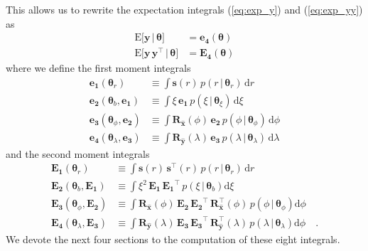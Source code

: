 \documentclass[modern]{aastex62}
\begin{document}
%
This allows us to rewrite the expectation integrals (\ref{eq:exp_y})
and (\ref{eq:exp_yy}) as
%
\begin{align}
    \label{eq:exp_y_sep}
    \mathrm{E} \Big[ \mathbf{y} \, \Big| \, \pmb{\theta} \Big]
     & =
    \mathbf{e_4}(\pmb{\theta})
    \\[1em]
    \label{eq:exp_yy_sep}
    \mathrm{E} \Big[ \mathbf{y} \, \mathbf{y}^\top \, \Big| \, \pmb{\theta} \Big]
     & =
    \mathbf{E_4}(\pmb{\theta})
\end{align}
%
where we define the first moment integrals
%
\begin{align}
    \label{eq:e1}
    \mathbf{e_1}(\pmb{\theta}_r)
     & \equiv
    \int
    \mathbf{s}(r) \,
    p(r \, \big| \, \pmb{\theta}_{r}) \,
    \mathrm{d}r
    \\[1em]
    \label{eq:e2}
    \mathbf{e_2}(\pmb{\theta}_b, \mathbf{e_1})
     & \equiv
    \int
    \xi \,
    \mathbf{e_1} \,
    p(\xi \, \big| \, \pmb{\theta}_{\xi}) \,
    \mathrm{d}\xi
    \\[1em]
    \label{eq:e3}
    \mathbf{e_3}(\pmb{\theta}_\phi, \mathbf{e_2})
     & \equiv
    \int
    \mathbf{R}_{\hat{\mathbf{x}}}(\phi) \,
    \mathbf{e_2} \,
    p(\phi \, \big| \, \pmb{\theta}_{\phi}) \,
    \mathrm{d}\phi
    \\[1em]
    \label{eq:e4}
    \mathbf{e_4}(\pmb{\theta}_\lambda, \mathbf{e_3})
     & \equiv
    \int
    \mathbf{R}_{\hat{\mathbf{y}}}(\lambda) \,
    \mathbf{e_3} \,
    p(\lambda \, \big| \, \pmb{\theta}_{\lambda}) \,
    \mathrm{d}\lambda
\end{align}
%
and the second moment integrals
%
\begin{align}
    \label{eq:E1}
    \mathbf{E_1}(\pmb{\theta}_r)
     & \equiv
    \int
    \mathbf{s}(r) \, \mathbf{s}^\top(r) \,
    p(r \, \big| \, \pmb{\theta}_{r}) \,
    \mathrm{d}r
    \\[1em]
    \label{eq:E2}
    \mathbf{E_2}(\pmb{\theta}_b, \mathbf{E_1})
     & \equiv
    \int
    \xi^2 \,
    \mathbf{E_1} \,
    \mathbf{E_1}^\top \,
    p(\xi \, \big| \, \pmb{\theta}_b)
    \mathrm{d}\xi
    \\[1em]
    \label{eq:E3}
    \mathbf{E_3}(\pmb{\theta}_\phi, \mathbf{E_2})
     & \equiv
    \int
    \mathbf{R}_{\hat{\mathbf{x}}}(\phi) \,
    \mathbf{E_2} \,
    \mathbf{E_2}^\top \,
    \mathbf{R}_{\hat{\mathbf{x}}}^\top(\phi) \,
    p(\phi \, \big| \, \pmb{\theta}_{\phi})
    \mathrm{d}\phi
    \\[1em]
    \label{eq:E4}
    \mathbf{E_4}(\pmb{\theta}_\lambda, \mathbf{E_3})
     & \equiv
    \int
    \mathbf{R}_{\hat{\mathbf{y}}}(\lambda) \,
    \mathbf{E_3} \,
    \mathbf{E_3}^\top \,
    \mathbf{R}_{\hat{\mathbf{y}}}^\top(\lambda) \,
    p(\lambda \, \big| \, \pmb{\theta}_{\lambda})
    \mathrm{d}\phi
    \quad.
\end{align}
%
We devote the next four sections to the computation of these eight
integrals.
\end{document}
